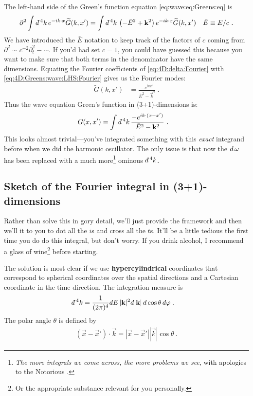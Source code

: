 The left-hand side of the Green's function equation \eqref{eq:wave:eq:Greens:eq} is 
\begin{align}
	\partial^2 \int \dbar^4k \, e^{-ik\cdot x} \tilde G(k,x')
	&=
	\int \dbar^4k \, \left(-\bar{E}^2+\vec{k}^2\right) e^{-ik\cdot x} \tilde G(k,x')
	&
	\bar{E}\equiv E/c
	 \ .
	\label{eq:4D:Greens:wave:LHS:Fourier}
\end{align}
We have introduced the $\bar E$ notation to keep track of the factors of $c$ coming from $\partial^2 \sim c^{-2}\partial_t^2 -\cdots$. If you'd had set $c=1$, you could have guessed this because you want to make sure that both terms in the denominator have the same dimensions.
Equating the Fourier coefficients of \eqref{eq:4D:delta:Fourier} with \eqref{eq:4D:Greens:wave:LHS:Fourier} gives us the Fourier modes:
\begin{align}
	\tilde G(k,x') &= \frac{-e^{ikx'}}{\bar{E}^2 - \vec{k}^2} \ .
\end{align}
Thus the wave equation Green's function in (3+1)-dimensions is:
\begin{align}
	G(x,x') &= \int \dbar^4k \, \frac{-e^{ik\cdot (x-x')}}{\bar{E}^2 - \vec{k}^2} \ .
	\label{eq:Greens:function:For:4D:int}
\end{align}
This looks almost trivial---you've integrated something with this \emph{exact} integrand before when we did the harmonic oscillator. The only issue is that now the $\dbar\omega$ has been replaced with a much more\footnote{\emph{The more integrals we come across, the more problems we see}, with apologies to the Notorious .} ominous $\dbar^4k$. 

\subsection{Sketch of the Fourier integral in (3+1)-dimensions}

Rather than solve this in gory detail, we'll just provide the framework and then we'll it to you to dot all the $i$s and cross all the $t$s.  It'll be a little tedious the first time you do do this integral, but don't worry. If you drink alcohol, I recommend a glass of wine\footnote{Or the appropriate substance relevant for you personally.} before starting.

The solution is most clear if we use \textbf{hypercylindrical} coordinates that correspond to spherical coordinates over the spatial directions and a Cartesian coordinate in the time direction. The integration measure is
\begin{align}
	\dbar^4k &= \frac{1}{(2\pi)^4} dE \, |\vec{k}|^2 d|\vec{k}|\, d\cos\theta \, d\varphi \ .
	\label{eq:4D:momentum:measure}
\end{align}
The polar angle $\theta$ is defined by 
\begin{align}
	(\vec{x}-\vec{x}')\cdot \vec{k} = |\vec{x}-\vec{x}'||\vec {k}| \cos\theta \ .
\end{align}

